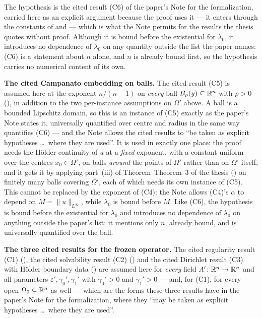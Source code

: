 \begin{theorem}[Theorem 4]
The hypothesis  is the cited result (C6) of the
paper's Note for the formalization, carried here as an explicit argument because
the proof uses it --- it enters through the constants of  and  --- which is what the
Note permits for the results the thesis quotes without proof.  Although it is
bound before the existential for $\lambda_0$, it introduces no dependence of
$\lambda_0$ on any quantity outside the list the paper names: (C6) is a statement
about $n$ alone, and $n$ is already bound first, so the hypothesis carries no
numerical content of its own.

\medskip
\noindent\textbf{The cited Campanato embedding on balls.}  The cited result
(C5) is assumed here at the exponent $n/(n-1)$ on \emph{every} ball
$B_\rho(y)\subseteq\mathbb{R}^n$ with $\rho>0$ (), in
addition to the two per-instance assumptions on $\Omega'$ above.  A ball is a
bounded Lipschitz domain, so this is an instance of (C5) exactly as the paper's
Note states it, universally quantified over centre and radius in the same way
 quantifies (C6) --- and the Note allows the
cited results to ``be taken as explicit hypotheses \ldots\ where they are
used''.  It is used in exactly one place: the proof needs the H\"older
continuity of $u$ at a \emph{fixed} exponent, with a constant uniform over the
centres $x_0\in\Omega'$, on balls \emph{around} the points of $\Omega'$ rather
than on $\Omega'$ itself, and it gets it by applying part~(iii) of
Theorem~Theorem~3 of the thesis () on finitely many balls
covering $\overline{\Omega'}$, each of which needs its own instance of (C5).
This cannot be replaced by the exponent of (C4): the Note allows (C4)'s
$\alpha$ to depend on $M=\|u\|_{L^\infty}$, while $\lambda_0$ is bound before
$M$.  Like (C6), the hypothesis is bound before the existential for $\lambda_0$
and introduces no dependence of $\lambda_0$ on anything outside the paper's
list: it mentions only $n$, already bound, and is universally quantified over
the ball.

\medskip
\noindent\textbf{The three cited results for the frozen operator.}  The cited
regularity result (C1) (), the cited solvability
result (C2) () and the cited Dirichlet result (C3)
with H\"older boundary data () are assumed here
for \emph{every} field $A'\colon\mathbb{R}^n\to\mathbb{R}^n$ and all parameters
$\varepsilon',\gamma_0',\gamma_1'$ with $\gamma_0'>0$ and $\gamma_1'>0$ --- and,
for (C1), for every open $\Omega_0\subseteq\mathbb{R}^n$ as well --- which are the forms
these three results have in the paper's Note for the formalization, where they
``may be taken as explicit hypotheses \ldots\ where they are used''.


\end{theorem}

